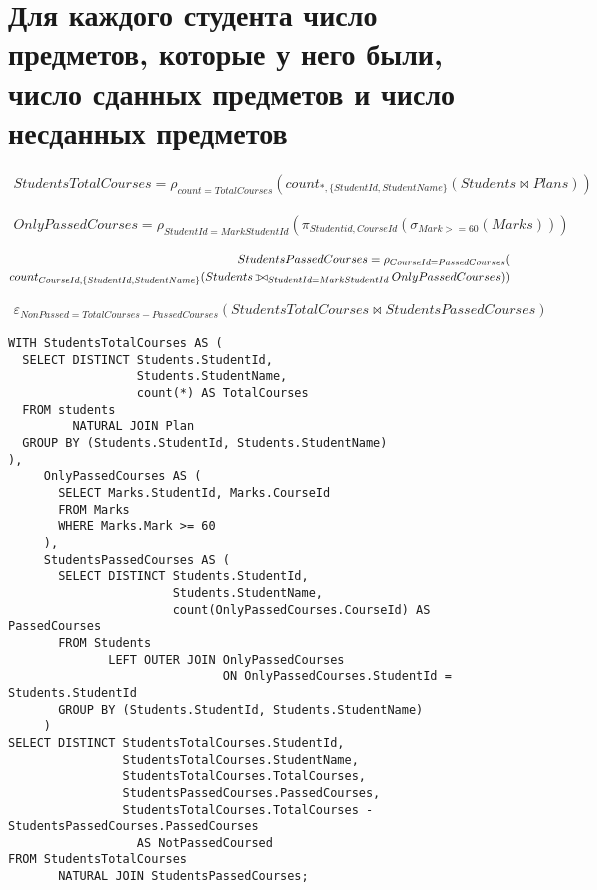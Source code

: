 \documentclass{article}
\def\ojoin{\setbox0=\hbox{$\bowtie$}%
  \rule[-.02ex]{.25em}{.4pt}\llap{\rule[\ht0]{.25em}{.4pt}}}
\def\leftouterjoin{\mathbin{\ojoin\mkern-5.8mu\bowtie}}
\begin{document}
	\section{Для каждого студента число предметов, которые у него были, число сданных предметов и число несданных предметов}
	
	\begin{align*}
	StudentsTotalCourses = \rho_{count = TotalCourses}(count_{*, \{StudentId, StudentName\}}(Students \bowtie Plans))
	\end{align*}
	
	\begin{align*}
		OnlyPassedCourses = \rho_{StudentId = MarkStudentId}(\pi_{Studentid, CourseId}(\sigma_{Mark >= 60}(Marks)))
	\end{align*}
	
	\begin{align*}
	StudentsPassedCourses = \rho_{CourseId = PassedCourses}(\\
	count_{CourseId, \{StudentId, StudentName\}}(Students \leftouterjoin_{StudentId = MarkStudentId} OnlyPassedCourses)
	)
	\end{align*}
	
	\begin{align*}
	\varepsilon_{NonPassed = TotalCourses - PassedCourses}(StudentsTotalCourses \bowtie StudentsPassedCourses)
	\end{align*}
	
\begin{verbatim}
WITH StudentsTotalCourses AS (
  SELECT DISTINCT Students.StudentId,
                  Students.StudentName,
                  count(*) AS TotalCourses
  FROM students
         NATURAL JOIN Plan
  GROUP BY (Students.StudentId, Students.StudentName)
),
     OnlyPassedCourses AS (
       SELECT Marks.StudentId, Marks.CourseId
       FROM Marks
       WHERE Marks.Mark >= 60
     ),
     StudentsPassedCourses AS (
       SELECT DISTINCT Students.StudentId,
                       Students.StudentName,
                       count(OnlyPassedCourses.CourseId) AS PassedCourses
       FROM Students
              LEFT OUTER JOIN OnlyPassedCourses
                              ON OnlyPassedCourses.StudentId = Students.StudentId
       GROUP BY (Students.StudentId, Students.StudentName)
     )
SELECT DISTINCT StudentsTotalCourses.StudentId,
                StudentsTotalCourses.StudentName,
                StudentsTotalCourses.TotalCourses,
                StudentsPassedCourses.PassedCourses,
                StudentsTotalCourses.TotalCourses - StudentsPassedCourses.PassedCourses
                  AS NotPassedCoursed
FROM StudentsTotalCourses
       NATURAL JOIN StudentsPassedCourses;
\end{verbatim}
\end{document}
